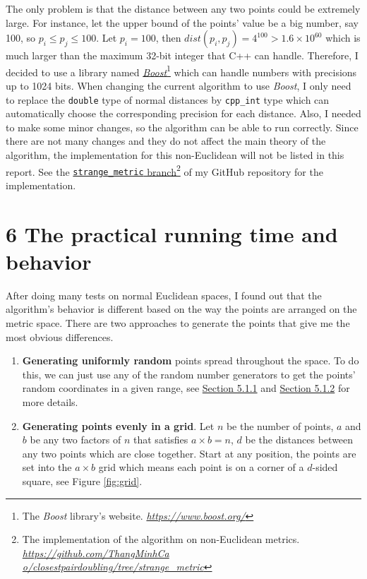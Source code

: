 \documentclass[12pt,english,]{article}
\newcommand{\code}[1]{\colorbox{light-gray}{\texttt{#1}}}
\begin{document}
The only problem is that the distance between any two points could be
extremely large. For instance, let the upper bound of the points' value
be a big number, say 100, so \(p_i \leq p_j \leq 100\). Let
\(p_i = 100\), then \(dist(p_i,p_j)=4^{100} > 1.6 \times 10^{60}\) which
is much larger than the maximum 32-bit integer that C++ can handle.
Therefore, I decided to use a library named
\href{https://www.boost.org/}{\emph{Boost}}\footnote{The \emph{Boost}
  library's website.
  \href{https://www.boost.org/}{\emph{https://www.boost.org/}}} which
can handle numbers with precisions up to 1024 bits. When changing the
current algorithm to use \emph{Boost}, I only need to replace the
\code{double} type of normal distances by \code{cpp\_int} type which can
automatically choose the corresponding precision for each distance.
Also, I needed to make some minor changes, so the algorithm can be able
to run correctly. Since there are not many changes and they do not
affect the main theory of the algorithm, the implementation for this
non-Euclidean will not be listed in this report. See the
\href{https://github.com/ThangMinhCao/closestpairdoubling/tree/strange_metric}{\code{strange\_metric}
branch}\footnote{The implementation of the algorithm on non-Euclidean
  metrics.
  \href{https://github.com/ThangMinhCao/closestpairdoubling/tree/strange_metric}{\emph{https://github.com/ThangMinhCa}
  \emph{o/closestpairdoubling/tree/strange\_metric}}} of my GitHub
repository for the implementation.

\hypertarget{section6}{%
\section{\texorpdfstring{6 \enspace The practical running time and
behavior}{6 The practical running time and behavior}}\label{section6}}

After doing many tests on normal Euclidean spaces, I found out that the
algorithm's behavior is different based on the way the points are
arranged on the metric space. There are two approaches to generate the
points that give me the most obvious differences.

\begin{enumerate}
\def\labelenumi{\arabic{enumi}.}
\item
  \textbf{Generating uniformly random} points spread throughout the
  space. To do this, we can just use any of the random number generators
  to get the points' random coordinates in a given range, see
  \protect\hyperlink{section5.1.1}{Section 5.1.1} and
  \protect\hyperlink{section5.1.2}{Section 5.1.2} for more details.
\item
  \textbf{Generating points evenly in a grid}. Let \(n\) be the number
  of points, \(a\) and \(b\) be any two factors of \(n\) that satisfies
  \(a\times b = n\), \(d\) be the distances between any two points which
  are close together. Start at any position, the points are set into the
  \(a \times b\) grid which means each point is on a corner of a
  \(d\)-sided square, see Figure \ref{fig:grid}.
\end{enumerate}
\end{document}
